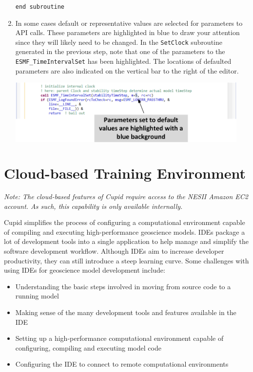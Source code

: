 \documentclass[oneside,11pt]{memoir}
\begin{document}
\begin{enumerate}
\begin{lstlisting}[label={lst:gen3}, caption=A subroutine template that implements the SetClock specialization point. The subroutine is inserted at the end of the module.]
end subroutine
\end{lstlisting}


\item In some cases default or representative values are selected for parameters to API calls. These parameters are highlighted in blue to draw your attention since they will likely need to be changed. In the \texttt{SetClock} subroutine generated in the previous step, note that one of the parameters to the \texttt{ESMF\_TimeIntervalSet} has been highlighted. The locations of defaulted parameters are also indicated on the vertical bar to the right of the editor.

\vspace{24pt}
\parbox{\linewidth}{\centering
  \includegraphics[width=12cm]{figs/gen_fig3.png}
}

\end{enumerate}


\chapter{Cloud-based Training Environment}

\emph{Note: The cloud-based features of Cupid require access to the NESII Amazon EC2 account. As such, this capability is only available internally.}

\vspace{24pt}

Cupid simplifies the process of configuring a computational environment capable of compiling and executing high-performance geoscience models. IDEs package a lot of development tools into a single application to help manage and simplify the software development workflow. Although IDEs aim to increase developer productivity, they can still introduce a steep learning curve. Some challenges with using IDEs for geoscience model development include:

\begin{itemize}
\item Understanding the basic steps involved in moving from source code to a running model
\item Making sense of the many development tools and features available in the IDE
\item Setting up a high-performance computational environment capable of configuring, compiling and executing model code
\item Configuring the IDE to connect to remote computational environments
\end{itemize}
\end{document}
